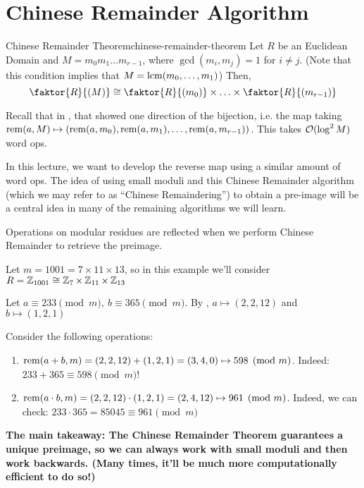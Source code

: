 
\section{Chinese Remainder Algorithm}

\begin{theorem}{Chinese Remainder Theorem}{chinese-remainder-theorem}
    Let $R$ be an Euclidean Domain and $M = m_0m_1 \ldots m_{r-1}$, where $\gcd(m_i, m_j) = 1$ for $i \neq j$.
    (Note that this condition implies that $M = \operatorname{lcm}(m_0, \ldots, m_1)$)
    Then,
    \begin{equation}
        \faktor{R}{(M)} \cong \faktor{R}{(m_0)} \times \ldots \times \faktor{R}{(m_{r-1})}
    \end{equation}
\end{theorem}

Recall that in ,  that showed one direction of the bijection, i.e. the map taking $\operatorname{rem}(a, M) \mapsto \left(\operatorname{rem}(a, m_0), \operatorname{rem}(a, m_1), \ldots, \operatorname{rem}(a, m_{r-1})\right)$.
This takes $\operatorname{\mathcal{O}}(\log^2 M)$ word ops.

In this lecture, we want to develop the reverse map using a similar amount of word ops.
The idea of using small moduli and this Chinese Remainder algorithm (which we may refer to as ``Chinese Remaindering'') to obtain a pre-image will be a central idea in many of the remaining algorithms we will learn.

\begin{example}{}{}
    Operations on modular residues are reflected when we perform Chinese Remainder to retrieve the preimage.

    Let $m = 1001 = 7 \times 11 \times 13$, so in this example we'll consider $R = \operatorname{\mathbb{Z}}_{1001} \cong \operatorname{\mathbb{Z}}_7 \times \operatorname{\mathbb{Z}}_{11} \times \operatorname{\mathbb{Z}}_{13}$
    
    Let $a \equiv 233 \pmod{m}, \ b \equiv 365 \pmod{m}$.
    By , $a \mapsto (2, 2, 12)$ and $b \mapsto (1, 2, 1)$
    
    Consider the following operations:
    \begin{enumerate}
        \item $\operatorname{rem}(a + b, m) = (2, 2, 12) + (1, 2, 1) = (3, 4, 0) \mapsto 598 \pmod{m}$.
        Indeed: $233 + 365 \equiv 598 \pmod{m}$!

        \item $\operatorname{rem}(a\cdot b, m) = (2, 2, 12)\cdot(1, 2, 1) = (2, 4 , 12) \mapsto 961 \pmod{m}$.
        Indeed, we can check: $233 \cdot 365 = 85045 \equiv 961 \pmod{m}$ 
    \end{enumerate}

    \bf{The main takeaway}: The Chinese Remainder Theorem guarantees a unique preimage, so we can always work with small moduli and then work backwards.
    (Many times, it'll be much more computationally efficient to do so!)
\end{example}

